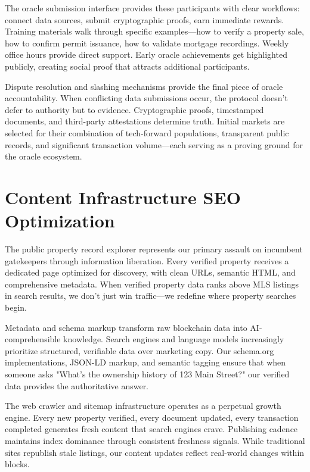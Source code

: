 The oracle submission interface provides these participants with clear workflows: connect data sources, submit cryptographic proofs, earn immediate rewards. Training materials walk through specific examples—how to verify a property sale, how to confirm permit issuance, how to validate mortgage recordings. Weekly office hours provide direct support. Early oracle achievements get highlighted publicly, creating social proof that attracts additional participants.

Dispute resolution and slashing mechanisms provide the final piece of oracle accountability. When conflicting data submissions occur, the protocol doesn't defer to authority but to evidence. Cryptographic proofs, timestamped documents, and third-party attestations determine truth. Initial markets are selected for their combination of tech-forward populations, transparent public records, and significant transaction volume—each serving as a proving ground for the oracle ecosystem.

\section{Content Infrastructure SEO Optimization}

The public property record explorer represents our primary assault on incumbent gatekeepers through information liberation. Every verified property receives a dedicated page optimized for discovery, with clean URLs, semantic HTML, and comprehensive metadata. When verified property data ranks above MLS listings in search results, we don't just win traffic—we redefine where property searches begin.

Metadata and schema markup transform raw blockchain data into AI-comprehensible knowledge. Search engines and language models increasingly prioritize structured, verifiable data over marketing copy. Our schema.org implementations, JSON-LD markup, and semantic tagging ensure that when someone asks "What's the ownership history of 123 Main Street?" our verified data provides the authoritative answer.

The web crawler and sitemap infrastructure operates as a perpetual growth engine. Every new property verified, every document updated, every transaction completed generates fresh content that search engines crave. Publishing cadence maintains index dominance through consistent freshness signals. While traditional sites republish stale listings, our content updates reflect real-world changes within blocks.

